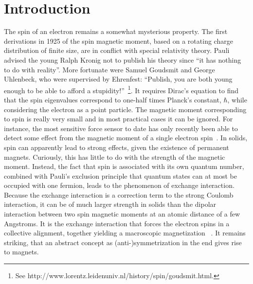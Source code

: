 \documentclass[rmp,twocolumn,aps]{revtex4}
\begin{document}
\section{Introduction}
\label{Introduction} The spin of an electron remains a somewhat
mysterious property. The first derivations in 1925 of the spin
magnetic moment, based on a rotating charge distribution of finite
size, are in conflict with special relativity theory. Pauli
advised the young Ralph Kronig not to publish his theory since
``it has nothing to do with reality''. More fortunate were Samuel
Goudsmit and George Uhlenbeck, who were supervised by Ehrenfest:
``Publish, you are both young enough to be able to afford a
stupidity!''~\footnote{See http://www.lorentz.leidenuniv.nl/history/spin/goudsmit.html.}. It requires Dirac's equation to
find that the spin eigenvalues correspond to one-half times
Planck's constant, $\hbar$, while considering the electron as a
point particle. The magnetic moment corresponding to spin is
really very small and in most practical cases it can be ignored.
For instance, the most sensitive force sensor to date has only
recently been able to detect some effect from the magnetic moment
of a single electron spin~\cite{rugar04}. In solids, spin can
apparently lead to strong effects, given the existence of
permanent magnets. Curiously, this has little to do with the
strength of the magnetic moment. Instead, the fact that spin is
associated with its own quantum number, combined with Pauli's
exclusion principle that quantum states can at most be occupied
with one fermion, leads to the phenomenon of exchange interaction.
Because the exchange interaction is a correction term to the
strong Coulomb interaction, it can be of much larger strength in
solids than the dipolar interaction between two spin magnetic
moments at an atomic distance of a few Angstroms. It is the
exchange interaction that forces the electron spins in a
collective alignment, together yielding a macroscopic
magnetization ~\cite{ashcroft}. It remains striking, that an abstract concept as
(anti-)symmetrization in the end gives rise to magnets.
\end{document}
